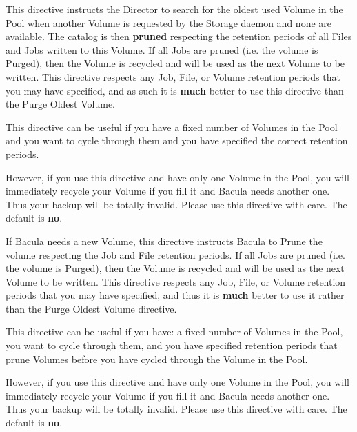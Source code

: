 \begin{description}
\label{RecycleOldest}
\item [Recycle Oldest Volume = \lt{}yes\vb{}no\gt{}]
   This directive instructs the Director to search for the oldest used
   Volume in the Pool when another Volume is requested by the Storage
   daemon and none are available.  The catalog is then {\bf pruned}
   respecting the retention periods of all Files and Jobs written to this
   Volume.  If all Jobs are pruned (i.e. the volume is Purged), then the
   Volume is recycled and will be used as the next Volume to be written.
   This directive respects any Job, File, or Volume retention periods that
   you may have specified, and as such it is {\bf much} better to use this
   directive than the Purge Oldest Volume.

   This directive can be useful if you have a fixed number of Volumes in the
   Pool and you want to cycle through them and you have specified the correct
   retention periods.  

   However, if you use this directive and have only one
   Volume in the Pool, you will immediately recycle your Volume if you fill
   it and Bacula needs another one. Thus your backup will be totally invalid.
   Please use this directive with care. The default is {\bf no}.

\label{RecycleCurrent}

\item [Recycle Current Volume = \lt{}yes\vb{}no\gt{}]
   If Bacula needs a new Volume, this directive instructs Bacula to Prune
   the volume respecting the Job and File retention periods.  If all Jobs
   are pruned (i.e.  the volume is Purged), then the Volume is recycled and
   will be used as the next Volume to be written.  This directive respects
   any Job, File, or Volume retention periods that you may have specified,
   and thus it is {\bf much} better to use it rather than the Purge Oldest
   Volume directive.

   This directive can be useful if you have: a fixed number of Volumes in
   the Pool, you want to cycle through them, and you have specified
   retention periods that prune Volumes before you have cycled through the
   Volume in the Pool.

   However, if you use this directive and have only one Volume in the Pool,
   you will immediately recycle your Volume if you fill it and Bacula needs
   another one.  Thus your backup will be totally invalid.  Please use this
   directive with care.  The default is {\bf no}.


\end{description}
